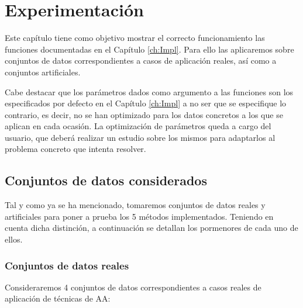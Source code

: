 \chapter{Experimentación}\label{ch:Experimentación}

Este capítulo tiene como objetivo mostrar el correcto funcionamiento las funciones documentadas en el Capítulo \ref{ch:Impl}. Para ello las aplicaremos sobre conjuntos de datos correspondientes a casos de aplicación reales, así como a conjuntos artificiales.

Cabe destacar que los parámetros dados como argumento a las funciones son los especificados por defecto en el Capítulo \ref{ch:Impl} a no ser que se especifique lo contrario, es decir, no se han optimizado para los datos concretos a los que se aplican en cada ocasión. La optimización de parámetros queda a cargo del usuario, que deberá realizar un estudio sobre los mismos para adaptarlos al problema concreto que intenta resolver.

\section{Conjuntos de datos considerados} \label{datasets}

Tal y como ya se ha mencionado, tomaremos conjuntos de datos reales y artificiales para poner a prueba los 5 métodos implementados. Teniendo en cuenta dicha distinción, a continuación se detallan los pormenores de cada uno de ellos.

\subsection{Conjuntos de datos reales}

Consideraremos 4 conjuntos de datos correspondientes a casos reales de aplicación de técnicas de \acf{AA}:

